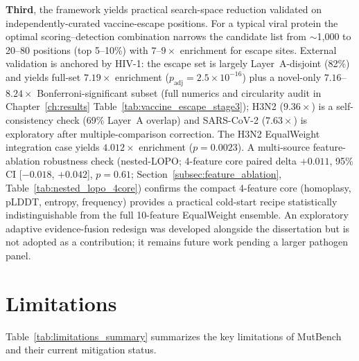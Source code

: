 \textbf{Third}, the framework yields practical search-space reduction validated on independently-curated vaccine-escape positions. For a typical viral protein the optimal scoring--detection combination narrows the candidate list from $\sim$1{,}000 to 20--80 positions (top 5--10\%) with $7$--$9\times$ enrichment for escape sites. External validation is anchored by HIV-1: the escape set is largely Layer~A-disjoint (82\%) and yields full-set $7.19\times$ enrichment ($p_{\text{adj}} = 2.5 \times 10^{-16}$) plus a novel-only $7.16$--$8.24\times$ Bonferroni-significant subset (full numerics and circularity audit in Chapter~\ref{ch:results} Table~\ref{tab:vaccine_escape_stage3}); H3N2 ($9.36\times$) is a self-consistency check (69\% Layer~A overlap) and SARS-CoV-2 ($7.63\times$) is exploratory after multiple-comparison correction. The H3N2 EqualWeight integration case yields $4.012\times$ enrichment ($p = 0.0023$). A multi-source feature-ablation robustness check (nested-LOPO; 4-feature core paired delta $+0.011$, 95\% CI [$-0.018$, $+0.042$], $p = 0.61$; Section~\ref{subsec:feature_ablation}, Table~\ref{tab:nested_lopo_4core}) confirms the compact 4-feature core (homoplasy, pLDDT, entropy, frequency) provides a practical cold-start recipe statistically indistinguishable from the full 10-feature EqualWeight ensemble.
An exploratory adaptive evidence-fusion redesign was developed alongside the dissertation but is not adopted as a contribution; it remains future work pending a larger pathogen panel.


\section{Limitations}
\label{sec:limitations}

Table~\ref{tab:limitations_summary} summarizes the key limitations of MutBench and their current mitigation status.

